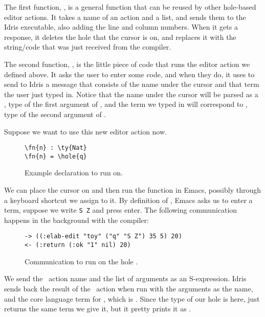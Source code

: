 The first function, , is a general function that can be
reused by other hole-based editor actions. It takes a name of an action and a
list, and sends them to the Idris executable, also adding the line and column
numbers. When it gets a response, it deletes the hole that the cursor is on,
and replaces it with the string/code that was just received from the compiler.

The second function, , is the little piece of code that runs the
 editor action we defined above. It asks the user to enter some code,
and when they do, it uses  to send to Idris a message
that consists of the name under the cursor and that term the user just typed
in. Notice that the name under the cursor will be parsed as a , type
of the first argument of , and the term we typed in will correspond to
\TT, type of the second argument of .

Suppose we want to use this new editor action now.

\begin{figure}[ht]
\caption{Example  declaration to run  on.}
\begin{Verbatim}[framesep=2mm, label=\footnotesize{\normalfont{Idris}}, labelposition=topline]
\fn{n} : \ty{Nat}
\fn{n} = \hole{q}
\end{Verbatim}
\end{figure}

We can place the cursor on  and then run the  function in
Emacs, possibly through a keyboard shortcut we assign to it.
By definition of , Emacs asks us to enter a term, suppose we
write \texttt{S Z} and press enter.
The following communication happens in the background with the compiler:

\begin{figure}[ht]
  \caption{Communication to run  on the hole .}
\begin{Verbatim}[framesep=2mm, label=\footnotesize{\normalfont{S-expression}}, labelposition=topline]
-> ((:elab-edit "toy" ("q" "S Z") 35 5) 20)
<- (:return (:ok "1" nil) 20)
\end{Verbatim}
\end{figure}

We send the \Elab\ action name  and the list of arguments as an
S-expression. Idris sends back the result of the \Elab\ action when run with
the arguments  as the name, and the core language term for ,
which is . Since the type of our hole is
 here,  just returns the same term we give it, but it pretty
prints it as .


